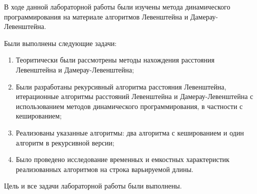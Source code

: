 
В ходе данной лабораторной работы были изучены метода динамического программирования на материале алгоритмов
Левенштейна и Дамерау-Левенштейна. 

Были выполнены следующие задачи:
\begin{enumerate}
	\item Теоритически были рассмотрены методы нахождения расстояния Левенштейна и Дамерау-Левенштейна;
	\item Были разработаны рекурсивный алгоритма расстояния Левенштейна, итерационные алгоритмы расстояний Левенштейна и Дамерау-Левенштейна с использованием методов динамического программирования, в частности с кешированием; 
	\item Реализованы указанные алгоритмы: два алгоритма с кешированием и один алгоритм в рекурсивной версии; 
	\item Было проведено исследование временных и емкостных характеристик реализованных алгоритмов на строка варьируемой длины.
\end{enumerate}

Цель и все задачи лабораторной работы были выполнены.

